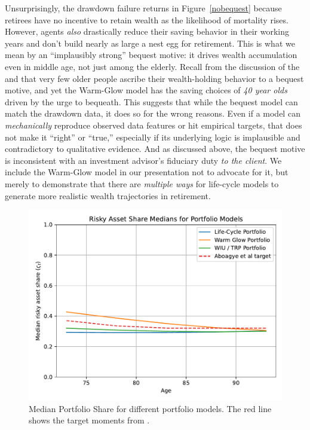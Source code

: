 \documentclass{article}
\begin{document}
Unsurprisingly, the drawdown failure returns in Figure~\ref{nobequest} because retirees have no incentive to retain wealth as the likelihood of mortality rises.
However, agents \textit{also} drastically reduce their saving behavior in their working years and don't build nearly as large a nest egg for retirement.
This is what we mean by an ``implausibly strong'' bequest motive: it drives wealth accumulation even in middle age, not just among the elderly.
Recall from the discussion of the \cite{2023} and \cite{jaherGilded} that very few older people ascribe their wealth-holding behavior to a bequest motive, and yet the Warm-Glow model has the saving choices of \textit{40 year olds} driven by the urge to bequeath. This suggests that while the bequest model can match the drawdown data, it does so for the wrong reasons.
Even if a model can \textit{mechanically} reproduce observed data features or hit empirical targets, that does not make it ``right'' or ``true,'' especially if its underlying logic is implausible and contradictory to qualitative evidence.
And as discussed above, the bequest motive is inconsistent with an investment advisor's fiduciary duty \textit{to the client}.
We include the Warm-Glow model in our presentation not to advocate for it, but merely to demonstrate that there are \textit{multiple ways} for life-cycle models to generate more realistic wealth trajectories in retirement.

\begin{figure}[!htbp]
\centering
\includegraphics[width=0.7\linewidth]{files/ShareMomentFit-a67cc0c97284fd1fa5f88739da90a8d8.pdf}
\caption[]{Median Portfolio Share for different portfolio models. The red line shows the target moments from \cite{Aboagye2024}.}
\label{medshare}
\end{figure}
\end{document}
